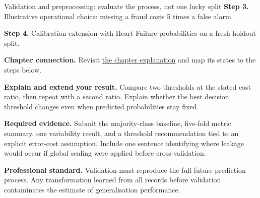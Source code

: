 \begin{labproject}{Validation and preprocessing: evaluate the process, not one lucky split}
\noindent\textbf{Step 3.} Illustrative operational choice: missing a fraud costs 5 times a false alarm.


\noindent\textbf{Step 4.} Calibration extension with Heart Failure probabilities on a fresh holdout split.

\textbf{Chapter connection.} Revisit \hyperref[ch:validation]{the chapter explanation} and map its states to the steps below.


\begin{verification}
\textbf{Explain and extend your result.} Compare two thresholds at the stated cost ratio, then repeat with a second ratio. Explain whether the best decision threshold changes even when predicted probabilities stay fixed.


\textbf{Required evidence.} Submit the majority-class baseline, five-fold metric summary, one variability result, and a threshold recommendation tied to an explicit error-cost assumption. Include one sentence identifying where leakage would occur if global scaling were applied before cross-validation.

\textbf{Professional standard.} Validation must reproduce the full future prediction process. Any transformation learned from all records before validation contaminates the estimate of generalisation performance.
\end{verification}
\end{labproject}
